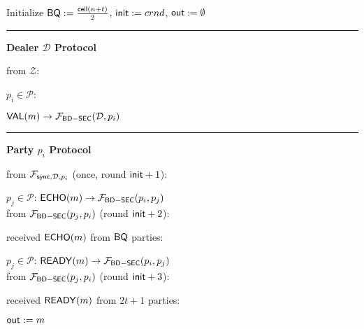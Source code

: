 \begin{bbox}[title={$\Pi_{\msf{Bracha}} (\mathcal{D}, \mathcal{P} = p_1,...,p_n)$ in $\F_{\msf{BD-SEC}}$-hybrid}]

Initialize ${\mathsf {BQ}} := \frac{{\mathsf {ceil}}(n+t)}{2}$, ${\mathsf {init}} := crnd$, ${\mathsf {out}} := \emptyset$

\vspace{2mm} \hrule \vspace{2mm}

{\bf Dealer $\mathcal{D}$ Protocol}

\OnInput {} from $\mathcal{Z}$:

	\quad \For $p_i \in \mathcal{P}$:

		\quad \quad \Send ${\mathsf {VAL}}(m) \rightarrow \mathcal{F}_{{\mathsf {BD-SEC}}}(\mathcal{D},p_i)$

\vspace{2mm} \hrule \vspace{2mm}

{\bf Party $p_i$ Protocol}

\OnInput {} from $\mathcal{F}_{{\mathsf {sync}},\mathcal{D},p_i}$ (once, round ${\mathsf {init}}+1$):

	\quad \For $p_j \in \mathcal{P}$: \Send ${\mathsf {ECHO}}(m) \rightarrow \mathcal{F}_{{\mathsf {BD-SEC}}}(p_i,p_j)$ \\

 \OnInput {} from $\mathcal{F}_{{\mathsf {BD-SEC}}}(p_j,p_i)$ (round ${\mathsf {init}}+2$):

	\quad \If received ${\mathsf {ECHO}}(m)$ from ${\mathsf {BQ}}$ parties:

		\quad \quad \For $p_j \in \mathcal{P}$: \Send ${\mathsf {READY}}(m) \rightarrow \mathcal{F}_{{\mathsf {BD-SEC}}}(p_i,p_j)$ \\

\OnInput {} from $\mathcal{F}_{{\mathsf {BD-SEC}}}(p_j,p_i)$ (round ${\mathsf {init}}+3$):

	\quad \If received ${\mathsf {READY}}(m)$ from $2t+1$ parties:

		\quad \quad ${\mathsf {out}} := m$





\end{bbox}
